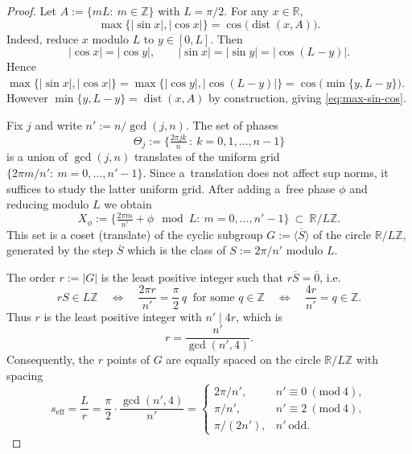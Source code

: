 \documentclass[12pt,fleqn]{amsart}
\theoremstyle{remark}
\newcommand{\1}{\mathbf{1}}
\begin{document}
\begin{proof}
Let $A:=\{mL:\ m\in\mathbb Z\}$ with $L=\pi/2$. For any $x\in\mathbb R$,
\begin{equation}\label{eq:max-sin-cos}
\max\{|\sin x|,|\cos x|\}=\cos\big(\operatorname{dist}(x,A)\big).
\end{equation}
Indeed, reduce $x$ modulo $L$ to $y\in[0,L]$. Then
\[
|\cos x|=|\cos y|,\qquad |\sin x|=|\sin y|=|\cos(L-y)|.
\]
Hence $\max\{|\sin x|,|\cos x|\}=\max\{|\cos y|,|\cos(L-y)|\}=\cos\big(\min\{y,L-y\}\big)$.
However $\min\{y,L-y\}=\operatorname{dist}(x,A)$ by construction, giving \eqref{eq:max-sin-cos}.

\smallskip

Fix $j$ and write $n':=n/\gcd(j,n)$. The set of phases
\[
\Theta_j:=\Big\{\tfrac{2\pi jk}{n}\,:\ k=0,1,\dots,n-1\Big\}
\]
is a union of $\gcd(j,n)$ translates of the uniform grid $\{2\pi m/n':\ m=0,\dots,n'-1\}$. Since a~translation does not affect sup norms, it suffices to study the latter uniform grid. After adding a~free phase $\phi$ and reducing modulo $L$ we obtain
\[
X_\phi:=\Big\{\tfrac{2\pi m}{n'}+\phi\ \bmod L:\ m=0,\dots,n'-1\Big\}\ \subset \ \mathbb R/L\mathbb Z.
\]
This set is a coset (translate) of the cyclic subgroup $G:=\langle \overline{S}\rangle$ of the circle $\mathbb R/L\mathbb Z$, generated by the step $\overline{S}$ which is the class of $S:=2\pi/n'$ modulo $L$.

\smallskip

The order $r:=|G|$ is the least positive integer such that $r\overline{S}=\overline{0}$, i.e.
\[
rS\in L\mathbb Z \quad\Longleftrightarrow\quad \frac{2\pi r}{n'}=\frac{\pi}{2}\,q \ \text{ for some } q\in\mathbb Z
\quad\Longleftrightarrow\quad \frac{4r}{n'}=q\in\mathbb Z.
\]
Thus $r$ is the least positive integer with $n' \mid 4r$, which is
\[
r=\frac{n'}{\gcd(n',4)}.
\]
Consequently, the $r$ points of $G$ are equally spaced on the circle $\mathbb R/L\mathbb Z$ with spacing
\begin{equation}\label{eq:seff}
s_{\mathrm{eff}}=\frac{L}{r}=\frac{\pi}{2}\cdot\frac{\gcd(n',4)}{n'}
=
\begin{cases}
2\pi/n',   & n'\equiv 0\ (\mathrm{mod}\ 4),\\[1mm]
\pi/n',    & n'\equiv 2\ (\mathrm{mod}\ 4),\\[1mm]
\pi/(2n'), & n'\ \text{odd}.
\end{cases}
\end{equation}

\smallskip


\end{proof}
\end{document}
